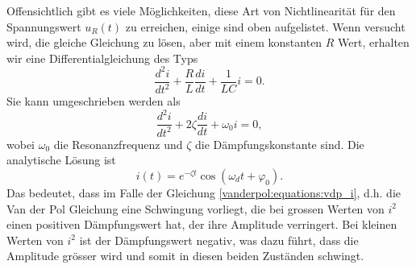 \noindent Offensichtlich gibt es viele Möglichkeiten, diese Art von Nichtlinearität für den Spannungswert $u_R(t)$ zu erreichen, einige sind oben aufgelistet.
Wenn versucht wird, die gleiche Gleichung zu lösen, aber mit einem konstanten $R$ Wert, erhalten wir eine Differentialgleichung des Typs
\begin{equation}
\frac{d^{2}i}{d t^{2}}+\frac{R}{L} \frac{d i}{d t}+\frac{1}{LC}i = 0.
\end{equation}
Sie kann umgeschrieben werden als
\begin{equation}
\frac{d^{2}i}{d t^{2}}+ 2\zeta \frac{d i}{d t}+\omega_0i = 0,
\end{equation}
wobei $\omega_0$ die Resonanzfrequenz und $\zeta$ die Dämpfungskonstante sind. Die analytische Lösung ist
%
%
\begin{equation}
i(t) = e^{-\zeta t} \cos(\omega_dt+\varphi_0).
\end{equation}
Das bedeutet, dass im Falle der Gleichung \eqref{vanderpol:equations:vdp_i}, d.h. die Van der Pol Gleichung eine Schwingung vorliegt, die bei grossen Werten von $i^2$ einen positiven Dämpfungswert hat, der ihre Amplitude verringert. Bei kleinen Werten von $i^2$ ist der Dämpfungswert negativ, was dazu führt, dass die Amplitude grösser wird und somit in diesen beiden Zuständen schwingt.

